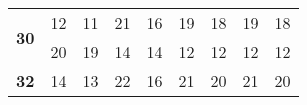 \begin{table}[!htbp]
{\begin{tabular}{|c|ll|ll|ll|ll|}
\multirow{2}{*}{\textbf{30}}     & \multicolumn{1}{l|}{12}                                                                                 & 11                                                                                                   & \multicolumn{1}{l|}{21}                                                                                 & 16                                                                                                   & \multicolumn{1}{l|}{19}                                                                                 & 18                                                                                                   & \multicolumn{1}{l|}{19}                                                                                 & 18                                                                                                   \\ \cline{2-9} 
                                 & \multicolumn{1}{l|}{20}                                                                                 & 19                                                                                                   & \multicolumn{1}{l|}{14}                                                                                 & 14                                                                                                   & \multicolumn{1}{l|}{12}                                                                                 & 12                                                                                                   & \multicolumn{1}{l|}{12}                                                                                 & 12                                                                                                   \\ \hline
\multirow{2}{*}{\textbf{32}}     & \multicolumn{1}{l|}{14}                                                                                 & 13                                                                                                   & \multicolumn{1}{l|}{22}                                                                                 & 16                                                                                                   & \multicolumn{1}{l|}{21}                                                                                 & 20                                                                                                   & \multicolumn{1}{l|}{21}                                                                                 & 20                                                                                                   \\ \cline{2-9} 

\end{tabular}}
\end{table}
